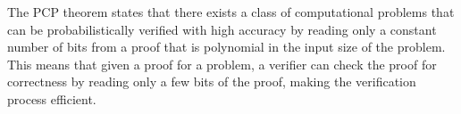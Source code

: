 %
%
The PCP theorem states that there exists a class of computational problems that can be probabilistically verified with high accuracy by reading only a constant number of bits from a proof that is polynomial in the input size of the problem. This means that given a proof for a problem, a verifier can check the proof for correctness by reading only a few bits of the proof, making the verification process efficient.
%
%
%


